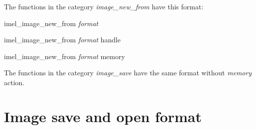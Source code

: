 The functions in the category {\itshape image\+\_\+new\+\_\+from} have this format\+:


\begin{DoxyItemize}
\item imel\+\_\+image\+\_\+new\+\_\+from {\itshape format}
\item imel\+\_\+image\+\_\+new\+\_\+from {\itshape format} handle
\item imel\+\_\+image\+\_\+new\+\_\+from {\itshape format} memory
\end{DoxyItemize}

The functions in the category {\itshape image\+\_\+save} have the same format without {\itshape memory} action.

\section*{Image save and open format}

